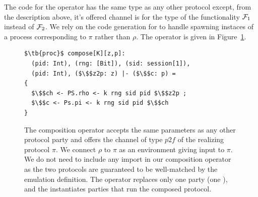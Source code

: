 The code for the operator has the same type as any other protocol except, from the description above, it's offered channel is for the type of the functionality $\mathcal{F}_1$ instead of $\mathcal{F}_2$.
We rely on the code generation for to handle spawning instaces of a  process corresponding to $\pi$ rather than $\rho$.
The operator is given in Figure~\ref{lst:compose}.
\begin{figure}
\begin{lstlisting}[basicstyle=\small\BeraMonottFamily, frame=single, mathescape]
$\tb{proc}$ compose[K][z,p]:
  (pid: Int), (rng: [Bit]), (sid: session[1]),
  (pid: Int), ($\$$z2p: z) |- ($\$$c: p) =
{
  $\$$ch <- PS.rho <- k rng sid pid $\$$z2p ;
  $\$$c <- Ps.pi <- k rng sid pid $\$$ch 
}
\end{lstlisting}
\caption{The composition operator accepts the same parameters as any other protocol party and offers the channel of type $p2f$ of the realizing protocol $\pi$. We connect $\rho$ to $\pi$ as an environment giving input to $\pi$. We do not need to include any import in our composition operator as the two protocols are guaranteed to be well-matched by the emulation definition. The operator replaces only one party (one ), and the \partywrapper instantiates parties that run the composed protocol.}
\label{lst:compose}
\end{figure}

